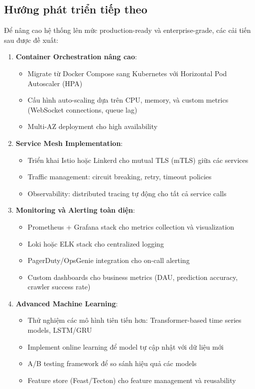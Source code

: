 \subsection{Hướng phát triển tiếp theo}

Để nâng cao hệ thống lên mức production-ready và enterprise-grade, các cải tiến sau được đề xuất:

\begin{enumerate}
    \item \textbf{Container Orchestration nâng cao}:
    \begin{itemize}
        \item Migrate từ Docker Compose sang Kubernetes với Horizontal Pod Autoscaler (HPA)
        \item Cấu hình auto-scaling dựa trên CPU, memory, và custom metrics (WebSocket connections, queue lag)
        \item Multi-AZ deployment cho high availability
    \end{itemize}
    
    \item \textbf{Service Mesh Implementation}:
    \begin{itemize}
        \item Triển khai Istio hoặc Linkerd cho mutual TLS (mTLS) giữa các services
        \item Traffic management: circuit breaking, retry, timeout policies
        \item Observability: distributed tracing tự động cho tất cả service calls
    \end{itemize}
    
    \item \textbf{Monitoring và Alerting toàn diện}:
    \begin{itemize}
        \item Prometheus + Grafana stack cho metrics collection và visualization
        \item Loki hoặc ELK stack cho centralized logging
        \item PagerDuty/OpsGenie integration cho on-call alerting
        \item Custom dashboards cho business metrics (DAU, prediction accuracy, crawler success rate)
    \end{itemize}
    
    \item \textbf{Advanced Machine Learning}:
    \begin{itemize}
        \item Thử nghiệm các mô hình tiên tiến hơn: Transformer-based time series models, LSTM/GRU
        \item Implement online learning để model tự cập nhật với dữ liệu mới
        \item A/B testing framework để so sánh hiệu quả các models
        \item Feature store (Feast/Tecton) cho feature management và reusability
    \end{itemize}
    

\end{enumerate}
